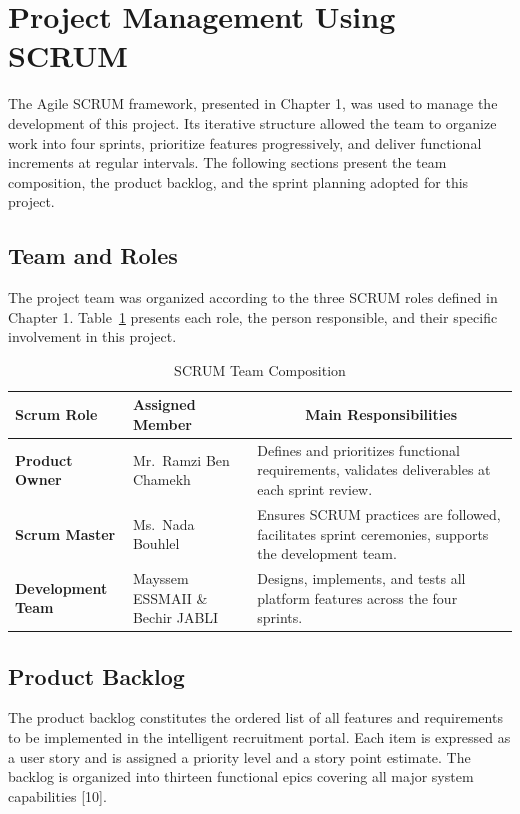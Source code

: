 \section{Project Management Using SCRUM}

The Agile SCRUM framework, presented in Chapter 1, was used to manage the development of this project. Its iterative structure allowed the team to organize work into four sprints, prioritize features progressively, and deliver functional increments at regular intervals. The following sections present the team composition, the product backlog, and the sprint planning adopted for this project.

\subsection{Team and Roles}

The project team was organized according to the three SCRUM roles defined in Chapter 1. Table~\ref{tab:scrumteam} presents each role, the person responsible, and their specific involvement in this project.

\begin{table}[H]
\centering
\renewcommand{\arraystretch}{1.6}
\begin{tabularx}{\textwidth}{|>{\bfseries\centering\arraybackslash}p{3.5cm}|>{\centering\arraybackslash}p{4cm}|X|}
\hline
\rowcolor{headerblue}
\textbf{Scrum Role} & \textbf{Assigned Member} & \multicolumn{1}{c|}{\textbf{Main Responsibilities}} \\
\hline
Product Owner
  & Mr.\ Ramzi Ben Chamekh
  & Defines and prioritizes functional requirements, validates deliverables at each sprint review. \\
\hline
Scrum Master
  & Ms.\ Nada Bouhlel
  & Ensures SCRUM practices are followed, facilitates sprint ceremonies, supports the development team. \\
\hline
Development Team
  & Mayssem ESSMAII \& Bechir JABLI
  & Designs, implements, and tests all platform features across the four sprints. \\
\hline
\end{tabularx}
\caption{SCRUM Team Composition}
\label{tab:scrumteam}
\end{table}

\subsection{Product Backlog}

The product backlog constitutes the ordered list of all features and requirements to be implemented in the intelligent recruitment portal. Each item is expressed as a user story and is assigned a priority level and a story point estimate. The backlog is organized into thirteen functional epics covering all major system capabilities [10].


